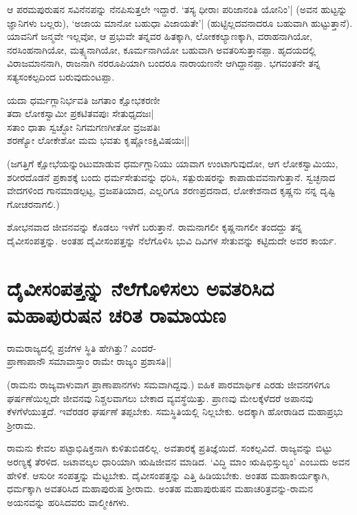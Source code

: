 ಆ ಪರಮಪುರುಷನ ಸವಿನೆನಪನ್ನು ನೆನಪಿಸುತ್ತಲೇ ಇದ್ದಾರೆ. `ತಸ್ಯ ಧೀರಾಃ ಪರಿಜಾನಂತಿ ಯೋನಿಂ'| (ಅವನ ಹುಟ್ಟನ್ನು ಜ್ಞಾನಿಗಳು ಬಲ್ಲರು), `ಅಜಾಯ ಮಾನೋ ಬಹುಧಾ ವಿಜಾಯತೇ'|\label{150a} (ಹುಟ್ಟಿಲ್ಲದವನಾದರೂ ಬಹುವಾಗಿ ಹುಟ್ಟುತ್ತಾನೆ). ಯಾವನಿಗೆ ಜನ್ಮವೇ ಇಲ್ಲವೋ, ಆ ಪ್ರಭುವೇ ತನ್ನವರ ಹಿತಕ್ಕಾಗಿ, ಲೋಕಕಲ್ಯಾಣಕ್ಕಾಗಿ, ವರಾಹನಾಗಿಯೋ, ನರಸಿಂಹನಾಗಿಯೋ, ಮತ್ಸ್ಯನಾಗಿಯೋ, ಕೂರ್ಮನಾಗಿಯೋ ಬಹುವಾಗಿ ಅವತರಿಸುತ್ತಾನಪ್ಪಾ. ಹೃದಯದಲ್ಲಿ ವಿರಾಜಮಾನನಾಗಿ, ರಾಜನಾಗಿ ನರರೂಪಿಯಾಗಿ ಬಂದರೂ ನಾರಾಯಣನೇ ಆಗಿದ್ದಾನಪ್ಪಾ. ಭಗವಂತನೇ ತನ್ನ ಸತ್ಯಸಂಕಲ್ಪದಿಂದ ಬರುವುದುಂಟಪ್ಪಾ. 

\begin{shloka} 
ಯದಾ ಧರ್ಮಗ್ಲಾನಿರ್ಭವತಿ ಜಗತಾಂ ಕ್ಷೋಭಕರಣೀ\label{150b}\\ 
ತದಾ ಲೋಕಸ್ವಾಮೀ ಪ್ರಕಟಿತವಪುಃ ಸೇತುಧೃದಜಃ|\\ 
ಸತಾಂ ಧಾತಾ ಸ್ವಚ್ಛೋ ನಿಗಮಗಣಗೀತೋ ವ್ರಜಪತಿಃ\\ 
ಶರಣ್ಯೋ ಲೋಕೇಶೋ ಮಮ ಭವತು ಕೃಷ್ಣೋಽಕ್ಷಿವಿಷಯಃ||
\end{shloka} 

(ಜಗತ್ತಿಗೆ ಕ್ಷೋಭೆಯನ್ನುಂಟುಮಾಡುವ ಧರ್ಮಗ್ಲಾನಿಯು ಯಾವಾಗ ಉಂಟಾಗುವುದೋ, ಆಗ ಲೋಕಸ್ವಾಮಿಯು, ಶರೀರದೊಡನೆ ಪ್ರಕಾಶಕ್ಕೆ ಬಂದು ಧರ್ಮಸೇತುವನ್ನು ಧರಿಸಿ, ಸತ್ಪುರುಷರನ್ನು ಕಾಪಾಡುವವನಾಗುತ್ತಾನೆ. ಸ್ವಚ್ಛನಾದ ವೇದಗಳಿಂದ ಗಾನಮಾಡಲ್ಪಟ್ಟ, ವ್ರಜಪತಿಯಾದ, ಎಲ್ಲರಿಗೂ ಶರಣಪ್ರದನಾದ, ಲೋಕೇಶನಾದ ಕೃಷ್ಣನು ನನ್ನ ದೃಷ್ಟಿ ಗೋಚರನಾಗಲಿ.) 

ಶೋಭನವಾದ ಜೀವನವನ್ನು ಕೊಡಲು ಇಳೆಗೆ ಬರುತ್ತಾನೆ. ರಾಮನಾಗಲೀ ಕೃಷ್ಣನಾಗಲೀ ತಂದದ್ದು ತನ್ನ ದೈವೀಸಂಪತ್ತನ್ನು. ಅಂತಹ ದೈವೀಸಂಪತ್ತನ್ನು ನೆಲೆಗೊಳಿಸಿ ಭುವಿ ದಿವಿಗಳ ಸೇತುವನ್ನು ಕಟ್ಟಿದುದೇ ಅವರ ಕಾರ್ಯ. 

\section*{ದೈವೀಸಂಪತ್ತನ್ನು ನೆಲೆಗೊಳಿಸಲು ಅವತರಿಸಿದ ಮಹಾಪುರುಷನ ಚರಿತ ರಾಮಾಯಣ} 

\begin{shloka} 
ರಾಮರಾಜ್ಯದಲ್ಲಿ ಪ್ರಜೆಗಳ ಸ್ಥಿತಿ ಹೇಗಿತ್ತು? ಎಂದರೆ-\\ 
ಪ್ರಾಣಾಪಾನೌ ಸಮಾವಾಸ್ತಾಂ ರಾಮೇ ರಾಜ್ಯಂ ಪ್ರಶಾಸತಿ||\label{151}
\end{shloka} 

(ರಾಮನು ರಾಜ್ಯವಾಳುವಾಗ ಪ್ರಾಣಾಪಾನಗಳು ಸಮವಾಗಿದ್ದವು.) ಐಹಿಕ ಪಾರಮಾರ್ಥಿಕ ಎರಡು ಜೀವನಗಳಿಗೂ ಘರ್ಷಣೆಯಿಲ್ಲದೇ ಜೀವನವು ನಿಶ್ಚಲವಾಗಲು ಬೇಕಾದ ವ್ಯವಸ್ಥೆಯಿತ್ತು. ಪ್ರಾಣವು ಮೇಲಕ್ಕೆಳೆದರೆ ಅಪಾನವು ಕೆಳಗೆಳೆಯುತ್ತದೆ. ಇವೆರಡರ ಘರ್ಷಣೆ ತಪ್ಪಬೇಕು. ಸಮಸ್ಥಿತಿಯಲ್ಲಿ ನಿಲ್ಲಬೇಕು. ಅದಕ್ಕಾಗಿ ಹೋರಾಡಿದ ಮಹಾಪ್ರಭು ಶ್ರೀರಾಮ. 

ರಾಮನು ಕೇವಲ ಪಟ್ಟಾಭಿಷಿಕ್ತನಾಗಿ ಕುಳಿತುಬಿಡಲಿಲ್ಲ. ಅವತಾರಕ್ಕೆ ಪ್ರತಿಜ್ಞೆಯಿದೆ. ಸಂಕಲ್ಪವಿದೆ. ರಾಜ್ಯವನ್ನು ಬಿಟ್ಟು ಅರಣ್ಯಕ್ಕೆ ತೆರಳಿದ. ಜಟಾವಲ್ಕಲ ಧಾರಿಯಾಗಿ ಋಷಿಜೀವನ ಮಾಡಿದ. `ವಿದ್ಧಿ ಮಾಂ ಋಷಿಭಿಸ್ತುಲ್ಯಂ'\label{151b} ಎಂಬುದು ಅವನ ಹೇಳಿಕೆ. ಆಸುರೀ ಸಂಪತ್ತನ್ನು ಮೆಟ್ಟಬೇಕು. ದೈವೀಸಂಪತ್ತನ್ನು ಎತ್ತಿ ಹಿಡಿಯಬೇಕು. ಅಂತಹ ಮಹಾಕಾರ್ಯಕ್ಕಾಗಿ, ಧರ್ಮಕ್ಕಾಗಿ ಅವತರಿಸಿದ ಮಹಾಪುರುಷ ಶ್ರೀರಾಮ. ಅಂತಹ ಮಹಾಪುರುಷನ ಮಹಾಚರಿತ್ರವನ್ನು-ರಾಮನ ಅಯನವನ್ನು ಹರಿಸಿದವರು ವಾಲ್ಮೀಕಿಗಳು. 

